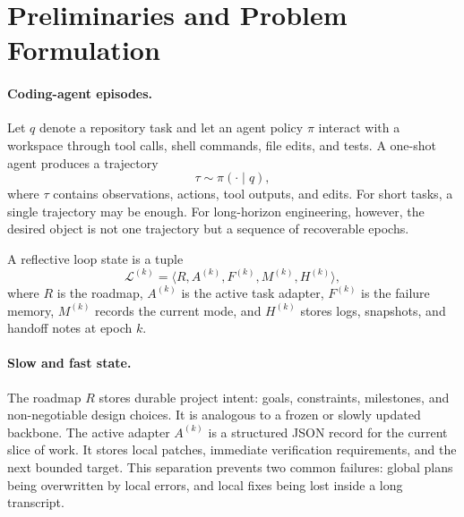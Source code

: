 \section{Preliminaries and Problem Formulation}
\label{sec:definition}

\paragraph{Coding-agent episodes.}
Let $q$ denote a repository task and let an agent policy $\pi$ interact with a workspace through tool calls, shell commands, file edits, and tests. A one-shot agent produces a trajectory
\begin{equation}
\tau \sim \pi(\cdot \mid q),
\end{equation}
where $\tau$ contains observations, actions, tool outputs, and edits. For short tasks, a single trajectory may be enough. For long-horizon engineering, however, the desired object is not one trajectory but a sequence of recoverable epochs.

\begin{definition}
A reflective loop state is a tuple
\begin{equation}
\mathcal{L}^{(k)} = \langle R, A^{(k)}, F^{(k)}, M^{(k)}, H^{(k)} \rangle,
\end{equation}
where $R$ is the roadmap, $A^{(k)}$ is the active task adapter, $F^{(k)}$ is the failure memory, $M^{(k)}$ records the current mode, and $H^{(k)}$ stores logs, snapshots, and handoff notes at epoch $k$.
\end{definition}

\paragraph{Slow and fast state.}
The roadmap $R$ stores durable project intent: goals, constraints, milestones, and non-negotiable design choices. It is analogous to a frozen or slowly updated backbone. The active adapter $A^{(k)}$ is a structured JSON record for the current slice of work. It stores local patches, immediate verification requirements, and the next bounded target. This separation prevents two common failures: global plans being overwritten by local errors, and local fixes being lost inside a long transcript.

